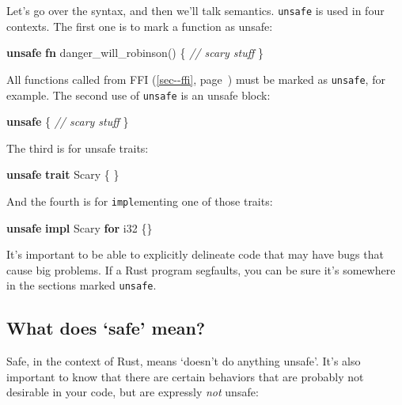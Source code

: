 \documentclass[a4paper,]{book}
\renewcommand*{\hyperref}[2][\ar]{%
  \def\ar{#2}%
  #2 (\autoref{#1}, page~\pageref{#1})}
\newenvironment{Shaded}{\begin{snugshade}}{\end{snugshade}}
\newcommand{\KeywordTok}[1]{\textcolor[rgb]{0.13,0.29,0.53}{\textbf{{#1}}}}
\newcommand{\DataTypeTok}[1]{\textcolor[rgb]{0.13,0.29,0.53}{{#1}}}
\newcommand{\CommentTok}[1]{\textcolor[rgb]{0.56,0.35,0.01}{\textit{{#1}}}}
\newcommand{\NormalTok}[1]{{#1}}
\begin{document}
Let's go over the syntax, and then we'll talk semantics. \texttt{unsafe}
is used in four contexts. The first one is to mark a function as unsafe:

\begin{Shaded}
\begin{Highlighting}[]
\KeywordTok{unsafe} \KeywordTok{fn} \NormalTok{danger_will_robinson() \{}
    \CommentTok{// scary stuff}
\NormalTok{\}}
\end{Highlighting}
\end{Shaded}

All functions called from \hyperref[sec--ffi]{FFI} must be marked as
\texttt{unsafe}, for example. The second use of \texttt{unsafe} is an
unsafe block:

\begin{Shaded}
\begin{Highlighting}[]
\KeywordTok{unsafe} \NormalTok{\{}
    \CommentTok{// scary stuff}
\NormalTok{\}}
\end{Highlighting}
\end{Shaded}

The third is for unsafe traits:

\begin{Shaded}
\begin{Highlighting}[]
\KeywordTok{unsafe} \KeywordTok{trait} \NormalTok{Scary \{ \}}
\end{Highlighting}
\end{Shaded}

And the fourth is for \texttt{impl}ementing one of those traits:

\begin{Shaded}
\begin{Highlighting}[]
\KeywordTok{unsafe} \KeywordTok{impl} \NormalTok{Scary }\KeywordTok{for} \DataTypeTok{i32} \NormalTok{\{\}}
\end{Highlighting}
\end{Shaded}

It's important to be able to explicitly delineate code that may have
bugs that cause big problems. If a Rust program segfaults, you can be
sure it's somewhere in the sections marked \texttt{unsafe}.

\subsection{\texorpdfstring{What does `safe'
mean?}{What does safe mean?}}\label{what-does-safe-mean}

Safe, in the context of Rust, means `doesn't do anything unsafe'. It's
also important to know that there are certain behaviors that are
probably not desirable in your code, but are expressly \emph{not}
unsafe:
\end{document}
